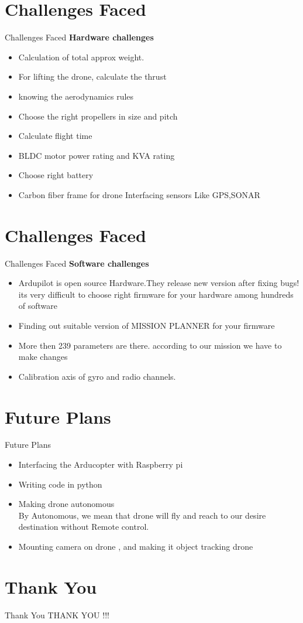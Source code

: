 \documentclass[10pt, a4paper]{beamer}
\begin{document}
\section{Challenges Faced}
\begin{frame}{Challenges Faced}
     \large\textbf{Hardware challenges}
	\begin{itemize}
	    \item Calculation of total approx weight.
	    \item For lifting the drone, calculate the thrust
	    \item knowing the aerodynamics rules
	    \item Choose the right propellers in size and pitch
	    \item Calculate flight time
	    \item BLDC motor power rating and KVA rating
	    \item Choose right battery 
	    \item Carbon fiber frame for drone
	    \inem Interfacing sensors Like GPS,SONAR
	    
	\end{itemize}
\end{frame}

\section{Challenges Faced}
\begin{frame}{Challenges Faced}
     \large\textbf{Software challenges}
	\begin{itemize}
	    \item Ardupilot is open source Hardware.They release new version after fixing bugs! its very difficult to choose right firmware  for your hardware among hundreds of software
	    \item Finding out suitable version of MISSION PLANNER for your firmware
	    \item More then 239 parameters are there. according to our mission we have to make changes
		\item Calibration axis of gyro and radio channels.
	\end{itemize}
\end{frame}


\section{Future Plans}
\begin{frame}{Future Plans}
	\begin{itemize}
	    
		\item Interfacing the Arducopter with Raspberry pi
		\item Writing code in python 
		\item Making drone autonomous\\
		By Autonomous, we mean that drone will fly and reach to our desire destination without Remote control.
		\item Mounting camera on drone , and making it object tracking drone
	\end{itemize}
\end{frame}


\section{Thank You}
\begin{frame}{Thank You}
	\centering THANK YOU !!!
\end{frame}
\end{document}
